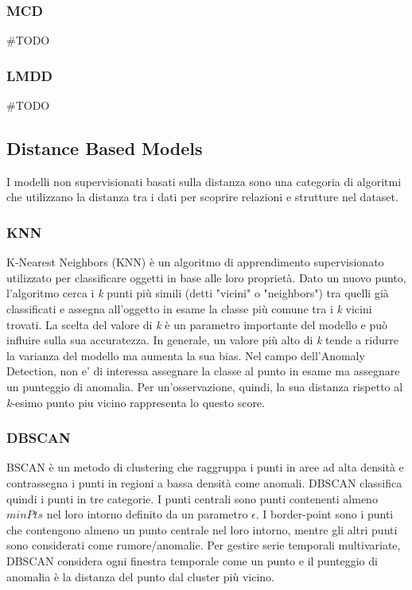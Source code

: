 \subsubsection{MCD}
\#TODO
\subsubsection{LMDD}
\#TODO

\subsection{Distance Based Models}
I modelli non supervisionati basati sulla distanza sono una categoria di algoritmi che utilizzano la distanza tra i dati per scoprire relazioni e strutture nel dataset.
\subsubsection{KNN}
K-Nearest Neighbors (KNN) è un algoritmo di apprendimento supervisionato utilizzato per classificare oggetti in base alle loro proprietà. Dato un nuovo punto, l'algoritmo cerca i \textit{k} punti più simili (detti "vicini" o "neighbors") tra quelli già classificati e assegna all'oggetto in esame la classe più comune tra i \textit{k} vicini trovati. La scelta del valore di \textit{k} è un parametro importante del modello e può influire sulla sua accuratezza. In generale, un valore più alto di \textit{k} tende a ridurre la varianza del modello ma aumenta la sua bias.
Nel campo dell'Anomaly Detection, non e' di interessa assegnare la classe al punto in esame ma assegnare un punteggio di anomalia. Per un'osservazione, quindi, la sua distanza rispetto al \textit{k}-esimo punto piu vicino rappresenta lo questo score.
\subsubsection{DBSCAN}
BSCAN è un metodo di clustering che raggruppa i punti in aree ad alta densità e contrassegna i punti in regioni a bassa densità come anomali.
DBSCAN classifica quindi i punti in tre categorie. I punti centrali sono punti
contenenti almeno $minPts$ nel loro intorno definito da un parametro $\epsilon$. I border-point sono i punti che contengono almeno un punto centrale nel loro intorno, mentre gli altri punti sono considerati come rumore/anomalie. 
Per gestire serie temporali multivariate, DBSCAN considera ogni finestra temporale come un punto e il punteggio di anomalia è la distanza del punto dal cluster più vicino.


